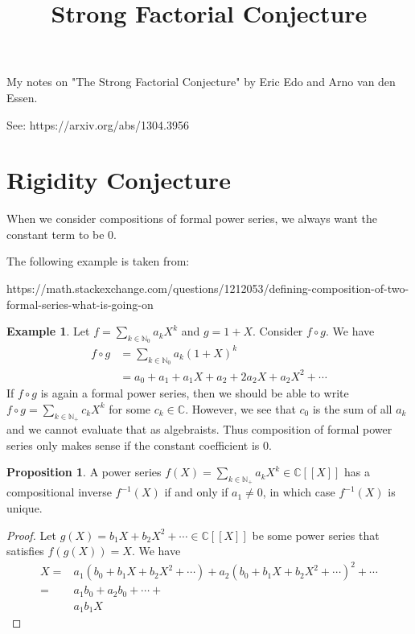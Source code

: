 \documentclass[a4paper]{article}
\title{Strong Factorial Conjecture}
\theoremstyle{definition}
\newtheorem{example}{Example}[definition]
\newtheorem{proposition}[definition]{Proposition}
\begin{document}

My notes on "The Strong Factorial Conjecture" by Eric Edo and Arno van den Essen.

See: https://arxiv.org/abs/1304.3956

\section{Rigidity Conjecture}

When we consider compositions of formal power series, we always want the constant term to be \(0\).

The following example is taken from:

https://math.stackexchange.com/questions/1212053/defining-composition-of-two-formal-series-what-is-going-on

\begin{example}
    Let \(f = \sum_{k \in \mathbb{N}_0} a_k X^k\) and \(g = 1 + X\). Consider \(f \circ g\). We have
    \begin{align*}
        f \circ g &= \sum_{k \in \mathbb{N}_0} a_k (1 + X)^k \\
        &= a_0 + a_1 + a_1 X + a_2 + 2 a_2 X + a_2 X^2 + \cdots
    \end{align*}
    If \(f \circ g\) is again a formal power series, then we should be able to write \(f \circ g = \sum_{k \in \mathbb{N}_+} c_k X^k\) for some \(c_k \in \mathbb{C}\). However, we see that \(c_0\) is the sum of all \(a_k\) and we cannot evaluate that as algebraists. Thus composition of formal power series only makes sense if the constant coefficient is \(0\).
\end{example}

\begin{proposition}
    A power series \(f(X) = \sum_{k \in \mathbb{N}_+} a_k X^k \in \mathbb{C}[[X]]\) has a compositional inverse \(f^{-1}(X)\) if and only if \(a_1 \neq 0\), in which case \(f^{-1}(X)\) is unique.
\end{proposition}

\begin{proof}
    Let \(g(X) = b_1 X + b_2 X^2 + \cdots \in \mathbb{C}[[X]]\) be some power series that satisfies \(f(g(X)) = X\). We have
    \begin{align}
        X =& a_1(b_0 + b_1 X + b_2 X^2 + \cdots) + a_2 (b_0 + b_1 X + b_2 X^2 + \cdots)^2 + \cdots \\
        =& a_1 b_0 + a_2 b_0 + \cdots + \\
        &a_1 b_1 X
    \end{align}
\end{proof}
\end{document}
